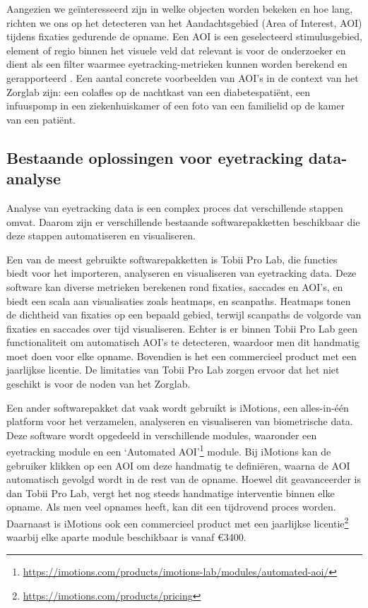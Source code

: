 Aangezien we geïnteresseerd zijn in welke objecten worden bekeken en hoe lang, richten we ons op het detecteren van het Aandachtsgebied (Area of Interest, AOI) tijdens fixaties gedurende de opname.
Een AOI is een geselecteerd stimulusgebied, element of regio binnen het visuele veld dat relevant is voor de onderzoeker en dient als een filter waarmee eyetracking-metrieken kunnen worden berekend en gerapporteerd \autocite{PAUSZEK2023100031}.
Een aantal concrete voorbeelden van AOI's in de context van het Zorglab zijn: een colafles op de nachtkast van een diabetespatiënt, een infuuspomp in een ziekenhuiskamer of een foto van een familielid op de kamer van een patiënt.


\subsection{Bestaande oplossingen voor eyetracking data-analyse}

Analyse van eyetracking data is een complex proces dat verschillende stappen omvat. Daarom zijn er verschillende bestaande softwarepakketten beschikbaar die deze stappen automatiseren en visualiseren.

Een van de meest gebruikte softwarepakketten is Tobii Pro Lab, die functies biedt voor het importeren, analyseren en visualiseren van eyetracking data.
Deze software kan diverse metrieken \autocite{tobii_pro_lab_metrics} berekenen rond fixaties, 
saccades en AOI's, en biedt een scala aan visualisaties \autocite{tobii_pro_lab_visualizations} zoals heatmaps, en scanpaths.
Heatmaps tonen de dichtheid van fixaties op een bepaald gebied, terwijl scanpaths de volgorde van fixaties en saccades over tijd visualiseren.
Echter is er binnen Tobii Pro Lab geen functionaliteit om automatisch AOI's te detecteren, waardoor men dit handmatig moet doen voor elke opname.
Bovendien is het een commercieel product met een jaarlijkse licentie.
De limitaties van Tobii Pro Lab zorgen ervoor dat het niet geschikt is voor de noden van het Zorglab.

Een ander softwarepakket dat vaak wordt gebruikt is iMotions, een alles-in-één platform voor het verzamelen, analyseren en visualiseren van biometrische data.
Deze software wordt opgedeeld in verschillende modules, waaronder een eyetracking module en een `Automated AOI'\footnote{\url{https://imotions.com/products/imotions-lab/modules/automated-aoi/}} module.
Bij iMotions kan de gebruiker klikken op een AOI om deze handmatig te definiëren, waarna de AOI automatisch gevolgd wordt in de rest van de opname.
Hoewel dit geavanceerder is dan Tobii Pro Lab, vergt het nog steeds handmatige interventie binnen elke opname. Als men veel opnames heeft, kan dit een tijdrovend proces worden.
Daarnaast is iMotions ook een commercieel product met een jaarlijkse licentie\footnote{\url{https://imotions.com/products/pricing}} waarbij elke aparte module beschikbaar is vanaf €3400.

